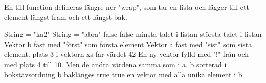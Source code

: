En till function defineras längre ner "wrap", som tar en lista och lägger till ett element längst fram och ett längst bak.

\Task %
\Subtask  String = "ka2"
\Subtask  String = "abra"
\Subtask  false
\Subtask  false
\Subtask  minsta talet i listan
\Subtask  största talet i listan
\Subtask  Vektor b fast med "först" som första element
\Subtask  Vektor a fast med "sist" som sista element.
\Subtask  plats 3 i vektorn xs får värdet 42
\Subtask  En ny vektor fylld med "!" från och med plats 4 till 10. Men de andra värdena samma som i a.
\Subtask  b sorterad i bokstävsordning
\Subtask  b baklänges
\Subtask  true
\Subtask  true
\Subtask  en vektor med alla unika element i b.

\Task %

